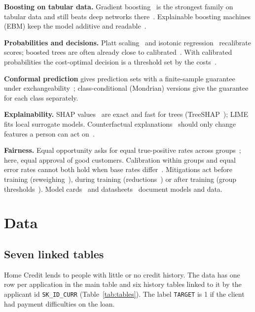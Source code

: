 \documentclass[conference,10pt]{IEEEtran}
\begin{document}
\textbf{Boosting on tabular data.} Gradient boosting~\cite{friedman2001,chen2016,ke2017} is the
strongest family on tabular data and still beats deep networks there~\cite{grinsztajn2022}.
Explainable boosting machines (EBM) keep the model additive and readable~\cite{nori2019}.

\textbf{Probabilities and decisions.} Platt scaling~\cite{platt1999} and isotonic
regression~\cite{zadrozny2002} recalibrate scores; boosted trees are often already close to
calibrated~\cite{niculescu2005}. With calibrated probabilities the cost-optimal decision is a
threshold set by the costs~\cite{elkan2001,bishop2006}.

\textbf{Conformal prediction} gives prediction sets with a finite-sample guarantee under
exchangeability~\cite{vovk2005,angelopoulos2021}; class-conditional (Mondrian) versions give the
guarantee for each class separately.

\textbf{Explainability.} SHAP values~\cite{lundberg2017} are exact and fast for trees
(TreeSHAP~\cite{lundberg2020}); LIME~\cite{ribeiro2016} fits local surrogate models.
Counterfactual explanations~\cite{wachter2018} should only change features a person can act
on~\cite{ustun2019}.

\textbf{Fairness.} Equal opportunity asks for equal true-positive rates across
groups~\cite{hardt2016}; here, equal approval of good customers. Calibration within groups and
equal error rates cannot both hold when base rates differ~\cite{kleinberg2017,chouldechova2017}.
Mitigations act before training (reweighing~\cite{kamiran2012}), during training
(reductions~\cite{agarwal2018}) or after training (group thresholds~\cite{hardt2016}). Model
cards~\cite{mitchell2019} and datasheets~\cite{gebru2021} document models and data.

\section{Data}
\label{sec:data}

\subsection{Seven linked tables}
Home Credit lends to people with little or no credit history. The data has one row per
application in the main table and six history tables linked to it by the applicant id
\texttt{SK\_ID\_CURR} (Table~\ref{tab:tables}). The label \texttt{TARGET} is 1 if the client had
payment difficulties on the loan.
\end{document}
